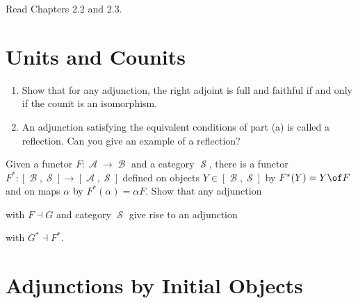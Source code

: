 \def\pathToRoot{../../}

\DeclareMathOperator{\A}{\mathscr A}
\DeclareMathOperator{\B}{\mathscr B}
\DeclareMathOperator{\M}{\mathscr M}
\DeclareMathOperator{\Sc}{\mathscr S}




\author{Mostafa Abouhamra}

\begin{hint}
Read Chapters 2.2 and 2.3.
\end{hint}

\section{Units and Counits}


\begin{exercise}
\begin{enumerate}
\item Show that for any adjunction, the right adjoint is full and faithful if and only if the counit is an isomorphism.
\item An adjunction satisfying the equivalent conditions of part (a) is called a reflection. Can you give an example of a reflection?
\end{enumerate}
\end{exercise}

\begin{exercise}
Given a functor $F: \A \rightarrow \B$ and a category $\Sc$, there is a functor $F^*: [\B,\Sc] \rightarrow [\A, \Sc]$ defined on objects $Y \in [\B,\Sc]$ by $F^*(Y) = Y \of F$ and on maps $\alpha$ by $F^*(\alpha) = \alpha F$. Show that any adjunction
with  $F \dashv G$ and category $\Sc$ give rise to an adjunction
with $G^* \dashv F^*$.
\end{exercise}

\section{Adjunctions by Initial Objects}

